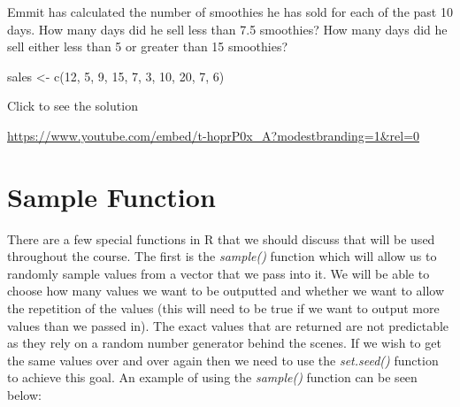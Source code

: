 \documentclass[
  letterpaper,
  DIV=11,
  numbers=noendperiod]{scrreprt}
\newenvironment{Shaded}{\begin{snugshade}}{\end{snugshade}}
\newcommand{\DecValTok}[1]{\textcolor[rgb]{0.68,0.00,0.00}{#1}}
\newcommand{\FunctionTok}[1]{\textcolor[rgb]{0.28,0.35,0.67}{#1}}
\newcommand{\NormalTok}[1]{\textcolor[rgb]{0.00,0.23,0.31}{#1}}
\newcommand{\OtherTok}[1]{\textcolor[rgb]{0.00,0.23,0.31}{#1}}
\begin{document}
\begin{tcolorbox}[enhanced jigsaw, colbacktitle=quarto-callout-tip-color!10!white, breakable, bottomrule=.15mm, colframe=quarto-callout-tip-color-frame, left=2mm, opacitybacktitle=0.6, title=\textcolor{quarto-callout-tip-color}{\faLightbulb}\hspace{0.5em}{Try it Out}, leftrule=.75mm, opacityback=0, rightrule=.15mm, titlerule=0mm, bottomtitle=1mm, colback=white, toprule=.15mm, arc=.35mm, toptitle=1mm, coltitle=black]

Emmit has calculated the number of smoothies he has sold for each of the
past 10 days. How many days did he sell less than 7.5 smoothies? How
many days did he sell either less than 5 or greater than 15 smoothies?

\begin{Shaded}
\begin{Highlighting}[]
\NormalTok{sales }\OtherTok{\textless{}{-}} \FunctionTok{c}\NormalTok{(}\DecValTok{12}\NormalTok{, }\DecValTok{5}\NormalTok{, }\DecValTok{9}\NormalTok{, }\DecValTok{15}\NormalTok{, }\DecValTok{7}\NormalTok{, }\DecValTok{3}\NormalTok{, }\DecValTok{10}\NormalTok{, }\DecValTok{20}\NormalTok{, }\DecValTok{7}\NormalTok{, }\DecValTok{6}\NormalTok{)}
\end{Highlighting}
\end{Shaded}

Click to see the solution

\url{https://www.youtube.com/embed/t-hoprP0x_A?modestbranding=1&rel=0}

\end{tcolorbox}

\section{Sample Function}\label{sample-function}

There are a few special functions in R that we should discuss that will
be used throughout the course. The first is the \emph{sample()} function
which will allow us to randomly sample values from a vector that we pass
into it. We will be able to choose how many values we want to be
outputted and whether we want to allow the repetition of the values
(this will need to be true if we want to output more values than we
passed in). The exact values that are returned are not predictable as
they rely on a random number generator behind the scenes. If we wish to
get the same values over and over again then we need to use the
\emph{set.seed()} function to achieve this goal. An example of using the
\emph{sample()} function can be seen below:
\end{document}
